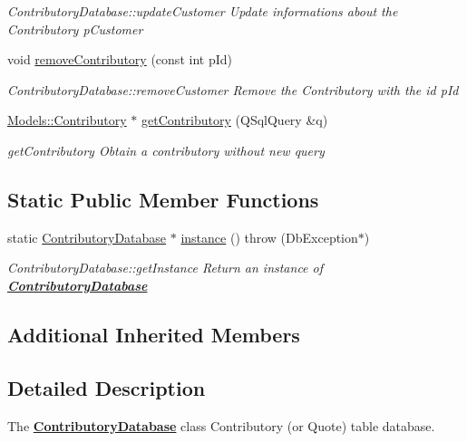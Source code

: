 \begin{DoxyCompactItemize}
\begin{DoxyCompactList}\small\item\em Contributory\-Database\-::update\-Customer Update informations about the Contributory {\itshape p\-Customer} \end{DoxyCompactList}\item 
void \hyperlink{classDatabases_1_1ContributoryDatabase_a3c99a1730bce8dbf3cab72896d8f17ff}{remove\-Contributory} (const int p\-Id)
\begin{DoxyCompactList}\small\item\em Contributory\-Database\-::remove\-Customer Remove the Contributory with the id {\itshape p\-Id} \end{DoxyCompactList}\item 
\hyperlink{classModels_1_1Contributory}{Models\-::\-Contributory} $\ast$ \hyperlink{classDatabases_1_1ContributoryDatabase_a6fc0f3eca03c49d919e7dbd2f8290555}{get\-Contributory} (Q\-Sql\-Query \&q)
\begin{DoxyCompactList}\small\item\em get\-Contributory Obtain a contributory without new query \end{DoxyCompactList}\end{DoxyCompactItemize}
\subsection*{Static Public Member Functions}
\begin{DoxyCompactItemize}
\item 
static \hyperlink{classDatabases_1_1ContributoryDatabase}{Contributory\-Database} $\ast$ \hyperlink{classDatabases_1_1ContributoryDatabase_ae0f4e8192dec79685b26e187d3871c4d}{instance} ()  throw (\-Db\-Exception$\ast$)
\begin{DoxyCompactList}\small\item\em Contributory\-Database\-::get\-Instance Return an instance of {\bfseries \hyperlink{classDatabases_1_1ContributoryDatabase}{Contributory\-Database}} \end{DoxyCompactList}\end{DoxyCompactItemize}
\subsection*{Additional Inherited Members}


\subsection{Detailed Description}
The {\bfseries \hyperlink{classDatabases_1_1ContributoryDatabase}{Contributory\-Database}} class Contributory (or Quote) table database. 

